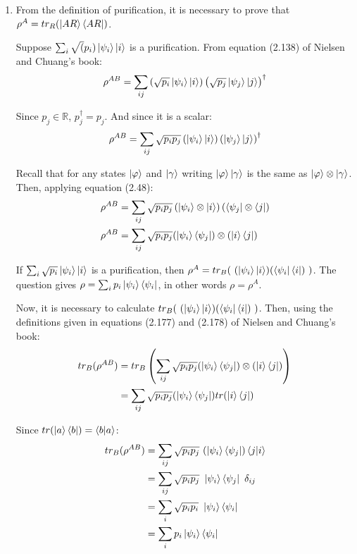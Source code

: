 \begin{enumerate}
\item From the definition of purification, it is necessary to prove that $\rho^A = tr_R(\ket{AR}\bra{AR})$.
    
    Suppose $\sum_i \sqrt(p_i) \ket{\psi_i} \ket{i}$ is a purification. From equation (2.138) of Nielsen and Chuang's book:
    \begin{align}
        \rho^{AB} = \sum_{ij} \left( \sqrt{p_i} \ket{\psi_i} \ket{i} \right) \left( \sqrt{p_j} \ket{\psi_j} \ket{j} \right) ^ \dagger
    \end{align}
    
    Since $p_j \in \mathbb{R}$, $p_j^\dagger = p_j$. And since it is a scalar:
    \begin{align}
        \rho^{AB} = \sum_{ij} \sqrt{p_i p_j} \left( \ket{\psi_i} \ket{i} \right) \left( \ket{\psi_j} \ket{j} \right) ^ \dagger
    \end{align}
    
    Recall that for any states $\ket{\varphi}$ and $\ket{\gamma}$ writing $\ket{\varphi} \ket{\gamma}$ is the same as $\ket{\varphi} \otimes \ket{\gamma}$. Then, applying equation (2.48):
    \begin{align}
        \rho^{AB} &= \sum_{ij} \sqrt{p_i p_j} \left( \ket{\psi_i} \otimes \ket{i} \right)
            \left( \bra{\psi_j} \otimes \bra{j} \right) \\
        \rho^{AB} &= \sum_{ij} \sqrt{p_i p_j} (\ket{\psi_i}\bra{\psi_j}) \otimes (\ket{i}\bra{j})
    \end{align}
    
    If $\sum_i \sqrt{p_i} \ket{\psi_i}\ket{i}$ is a purification, then
    $\rho^A = tr_B(\ (\ket{\psi_i}\ket{i}) (\bra{\psi_i}\bra{i})\ )$.
    The question gives $\rho = \sum_i p_i \ket{\psi_i}\bra{\psi_i}$, in other words $\rho = \rho^A$.
    
    Now, it is necessary to calculate $tr_B(\ (\ket{\psi_i}\ket{i}) (\bra{\psi_i}\bra{i})\ )$. Then, using the definitions given in equations (2.177) and (2.178) of Nielsen and Chuang's book:
    \begin{align}
        tr_B(\rho^{AB}) &= tr_B \left(\sum_{ij} \sqrt{p_i p_j} (\ket{\psi_i}\bra{\psi_j}) \otimes (\ket{i}\bra{j}) \right) \\
        &= \sum_{ij} \sqrt{p_i p_j} (\ket{\psi_i}\bra{\psi_j}) tr(\ket{i}\bra{j})
    \end{align}
    
    Since $tr(\ket{a}\bra{b}) = \braket{b|a}$:
    \begin{align}
        tr_B(\rho^{AB}) &= \sum_{ij} \sqrt{p_i p_j}\ (\ket{\psi_i}\bra{\psi_j}) \braket{j|i} \\
        &= \sum_{ij} \sqrt{p_i p_j}\ \ket{\psi_i}\bra{\psi_j}\ \delta_{ij} \\
        &= \sum_i \sqrt{p_i p_i}\ \ket{\psi_i}\bra{\psi_i} \\
        &= \sum_i p_i\ket{\psi_i}\bra{\psi_i}
    \end{align}
    

\end{enumerate}
